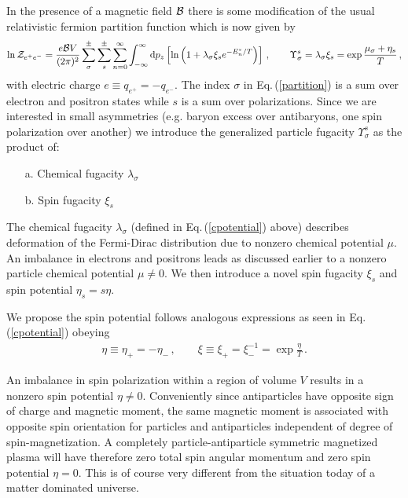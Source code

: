\documentclass[a4paper]{article}
\newcommand{\req}[1]{Eq.\,(\ref{#1})}
\newcommand*{\xblue}{\color{black}}
\begin{document}
In the presence of a magnetic field ${\cal B}$ there is some modification of the usual relativistic fermion partition function which is now given  by
\begin{align}
    \label{partition}
    \ln{\cal Z}_{e^{+}e^{-}}=\frac{e{\cal B}V}{(2\pi)^{2}}\sum_{\sigma}^{\pm}\sum_{s}^{\pm}\sum_{n=0}^{\infty}\int_{-\infty}^{\infty}{\rm d}p_{z}\left[\ln\left(1+\lambda_{\sigma}\xi_{s}e^{-E_{n}^{s}/T}\right)\right]\,,\qquad\Upsilon_{\sigma}^{s}=\lambda_{\sigma}\xi_{s}=\exp{\frac{\mu_{\sigma}+\eta_{s}}{T}}\,,
\end{align}
{\xblue with electric charge $e\equiv q_{e^{+}}=-q_{e^{-}}$.} The index $\sigma$ in \req{partition} is a sum over electron and positron states while $s$ is a sum over polarizations. Since we are interested in small asymmetries (e.g. baryon excess over antibaryons, one spin polarization over another) we introduce the generalized particle fugacity $\Upsilon_{\sigma}^{s}$ as the product of:
\begin{itemize}
    \item[a.] Chemical fugacity $\lambda_{\sigma}$
    \item[b.] Spin fugacity $\xi_{s}$
\end{itemize}
The chemical fugacity $\lambda_{\sigma}$ {\xblue (defined in \req{cpotential} above) describes deformation of the Fermi-Dirac distribution due to nonzero chemical potential $\mu$.} An imbalance in electrons and positrons leads {\xblue as discussed earlier} to a nonzero particle chemical potential $\mu\neq0$. We then introduce a novel spin fugacity $\xi_{s}$ and spin potential $\eta_{s}=s\eta$. {\xblue We propose the spin potential follows analogous expressions as seen in \req{cpotential} obeying
\begin{align}
    \label{spotential}
    \eta\equiv\eta_{+}=-\eta_{-}\,,\qquad
    \xi\equiv\xi_{+}=\xi_{-}^{-1}= \exp{\frac{\eta}{T}}\,.
\end{align}

An imbalance in spin polarization within a region of volume $V$ results in a nonzero spin potential $\eta\neq0$. Conveniently since antiparticles have opposite sign of charge and magnetic moment, the same magnetic moment is associated with opposite spin orientation for particles and antiparticles independent of degree of spin-magnetization. A completely particle-antiparticle symmetric magnetized plasma will have therefore zero total spin angular momentum and zero spin potential $\eta=0$. This is of course very different from the situation today of a matter dominated universe.}
\end{document}
